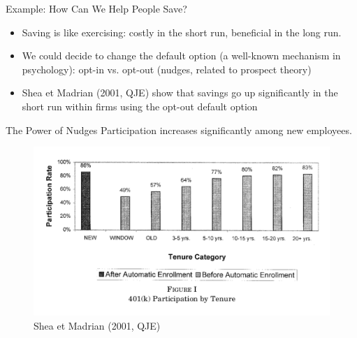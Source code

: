 \documentclass[handout]{beamer}
\begin{document}
\begin{frame}{Example: How Can We Help People Save?}

\begin{itemize}
\item Saving is like exercising: costly in the short run, beneficial in the long run.
\item We could decide to change the default option (a well-known mechanism in psychology): opt-in vs. opt-out (nudges, related to prospect theory)
\item Shea et Madrian (2001, QJE) show that savings go up significantly in the short run within firms using the opt-out default option
\end{itemize}

\end{frame}

\begin{frame}{The Power of Nudges}
Participation increases significantly among new employees.
	\begin{figure}
		\includegraphics[scale=0.45]{shea.png}
		\caption{Shea et Madrian (2001, QJE)}
	\end{figure}
\end{frame}
\end{document}
